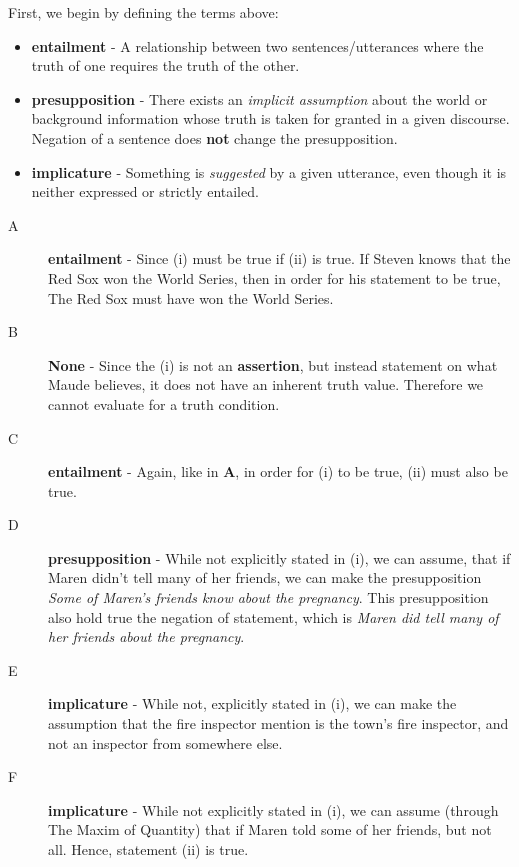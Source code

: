 \documentclass[11pt]{article}
\begin{document}
\begin{solution}
First, we begin by defining the terms above:
\begin{itemize}
    \item \textbf{entailment} - A relationship between two sentences/utterances where the truth of one requires the truth of the other.

    \item \textbf{presupposition} - There exists an \textit{implicit assumption} about the world or background information whose truth is taken for granted in a given discourse.  Negation of a sentence does \textbf{not} change the presupposition.

    \item \textbf{implicature} - Something is \textit{suggested} by a given utterance, even though it is neither expressed or strictly entailed.
\end{itemize}
\begin{description}
    \item[A] \textbf{entailment} - Since (i) must be true if (ii) is true.  If Steven knows that the Red Sox won the World Series, then in order for his statement to be true, The Red Sox must have won the World Series.  
    
    \item[B] \textbf{None} - Since the (i) is not an \textbf{assertion}, but instead statement on what Maude believes, it does not have an inherent truth value.  Therefore we cannot evaluate for a truth condition. 
     
    \item[C] \textbf{entailment} - Again, like in \textbf{A}, in order for (i) to be true, (ii) must also be true.
     
    \item[D] \textbf{presupposition} - While not explicitly stated in (i), we can assume, that if Maren didn't tell many of her friends, we can make the presupposition \textit{Some of Maren's friends know about the pregnancy}. This presupposition also hold true the negation of statement, which is \textit{Maren did tell many of her friends about the pregnancy}.

    \item[E] \textbf{implicature} - While not, explicitly stated in (i), we can make the assumption that the fire inspector mention is the town's fire inspector, and not an inspector from somewhere else.
     
    \item[F] \textbf{implicature} - While not explicitly stated in (i), we can assume (through The Maxim of Quantity) that if Maren told some of her friends, but not all.  Hence, statement (ii) is true.

\end{description}

\end{solution}
\end{document}
